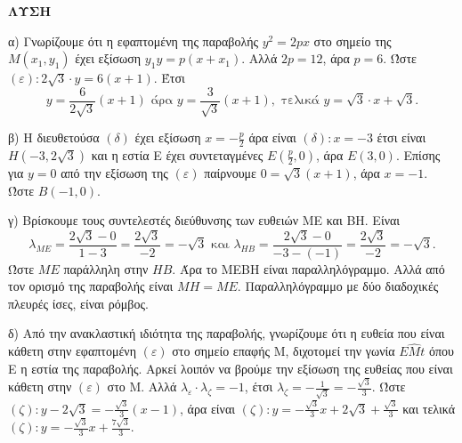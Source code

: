 \textbf{ΛΥΣΗ}

α) Γνωρίζουμε ότι η εφαπτομένη της παραβολής $y^2 = 2px$ στο σημείο της $M(x_1,y_1)$ έχει εξίσωση $y_1 y = p(x + x_1)$. Αλλά $2p = 12$, άρα $p = 6$. Ώστε $(\varepsilon): 2\sqrt{3} \cdot y = 6(x + 1)$. Έτσι
\[ y = \frac{6}{2\sqrt{3}}(x + 1) \text{ άρα } y = \frac{3}{\sqrt{3}}(x + 1), \text{ τελικά } y = \sqrt{3} \cdot x + \sqrt{3}. \]

β) Η διευθετούσα $(\delta)$ έχει εξίσωση $x = -\frac{p}{2}$ άρα είναι $(\delta): x = -3$ έτσι είναι $H(-3,2\sqrt{3})$ και η εστία E έχει συντεταγμένες $E(\frac{p}{2}, 0)$, άρα $E(3,0)$. Επίσης για $y = 0$ από την εξίσωση της $(\varepsilon)$ παίρνουμε $0 = \sqrt{3}(x + 1)$, άρα $x = -1$. Ώστε $B(-1,0)$.

γ) Βρίσκουμε τους συντελεστές διεύθυνσης των ευθειών ME και BH. Είναι
\[ \lambda_{ME} = \frac{2\sqrt{3} - 0}{1 - 3} = \frac{2\sqrt{3}}{-2} = -\sqrt{3} \text{ και } \lambda_{HB} = \frac{2\sqrt{3} - 0}{-3 - (-1)} = \frac{2\sqrt{3}}{-2} = -\sqrt{3}. \]
Ώστε $ME$ παράλληλη στην $HB$. Άρα το MEBH είναι παραλληλόγραμμο. Αλλά από τον ορισμό της παραβολής είναι $MH = ME$. Παραλληλόγραμμο με δύο διαδοχικές πλευρές ίσες, είναι ρόμβος.

δ) Από την ανακλαστική ιδιότητα της παραβολής, γνωρίζουμε ότι η ευθεία που είναι κάθετη στην εφαπτομένη $(\varepsilon)$ στο σημείο επαφής M, διχοτομεί την γωνία $E\hat{M}t$ όπου E η εστία της παραβολής. Αρκεί λοιπόν να βρούμε την εξίσωση της ευθείας που είναι κάθετη στην $(\varepsilon)$ στο M. Αλλά $\lambda_{\varepsilon} \cdot \lambda_{\zeta} = -1$, έτσι $\lambda_{\zeta} = -\frac{1}{\sqrt{3}} = -\frac{\sqrt{3}}{3}$. Ώστε $(\zeta): y - 2\sqrt{3} = -\frac{\sqrt{3}}{3}(x - 1)$, άρα είναι $(\zeta): y = -\frac{\sqrt{3}}{3}x + 2\sqrt{3} + \frac{\sqrt{3}}{3}$ και τελικά $(\zeta): y = -\frac{\sqrt{3}}{3}x + \frac{7\sqrt{3}}{3}$.

\endlysh